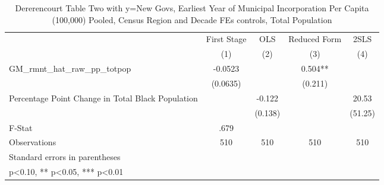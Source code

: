 \begin{table}[htbp]\centering
\def\sym#1{\ifmmode^{#1}\else\(^{#1}\)\fi}
\caption{Dererencourt Table Two with y=New Govs, Earliest Year of Municipal Incorporation Per Capita (100,000) Pooled, Census Region and Decade FEs controls, Total Population}
\begin{tabular}{l*{4}{c}}
\toprule
                    & First Stage   &         OLS   &Reduced Form   &        2SLS   \\
                    &\multicolumn{1}{c}{(1)}   &\multicolumn{1}{c}{(2)}   &\multicolumn{1}{c}{(3)}   &\multicolumn{1}{c}{(4)}   \\
\midrule
GM\_rmnt\_hat\_raw\_pp\_totpop&     -0.0523   &               &       0.504** &               \\
                    &    (0.0635)   &               &     (0.211)   &               \\
\addlinespace
Percentage Point Change in Total Black Population&               &      -0.122   &               &       20.53   \\
                    &               &     (0.138)   &               &     (51.25)   \\
\midrule
F-Stat              &        .679   &               &               &               \\
Observations        &         510   &         510   &         510   &         510   \\
\bottomrule
\multicolumn{5}{l}{\footnotesize Standard errors in parentheses}\\
\multicolumn{5}{l}{\footnotesize * p<0.10, ** p<0.05, *** p<0.01}\\
\end{tabular}
\end{table}
